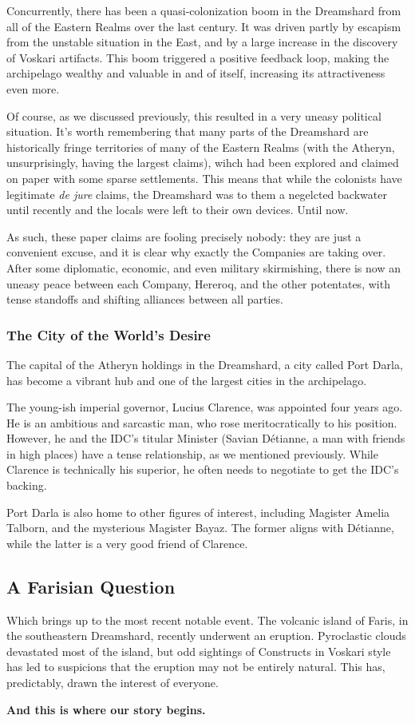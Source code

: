 Concurrently, there has been a quasi-colonization boom in the Dreamshard from all of the Eastern Realms over the last century. It was driven partly by escapism from the unstable situation in the East, and by a large increase in the discovery of Voskari artifacts. This boom triggered a positive feedback loop, making the archipelago wealthy and valuable in and of itself, increasing its attractiveness even more.

Of course, as we discussed previously, this resulted in a very uneasy political situation. It's worth remembering that many parts of the Dreamshard are historically fringe territories of many of the Eastern Realms (with the Atheryn, unsurprisingly, having the largest claims), wihch had been explored and claimed on paper with some sparse settlements. This means that while the colonists have legitimate \textit{de jure} claims, the Dreamshard was to them a negelcted backwater until recently and the locals were left to their own devices. Until now.

As such, these paper claims are fooling precisely nobody: they are just a convenient excuse, and it is clear why exactly the Companies are taking over. After some diplomatic, economic, and even military skirmishing, there is now an uneasy peace between each Company, Hereroq, and the other potentates, with tense standoffs and shifting alliances between all parties.


\subsubsection{The City of the World's Desire}

The capital of the Atheryn holdings in the Dreamshard, a city called Port Darla, has become a vibrant hub and one of the largest cities in the archipelago.

The young-ish imperial governor, Lucius Clarence, was appointed four years ago. He is an ambitious and sarcastic man, who rose meritocratically to his position. However, he and the IDC's titular Minister (Savian Détianne, a man with friends in high places) have a tense relationship, as we mentioned previously. While Clarence is technically his superior, he often needs to negotiate to get the IDC's backing.

Port Darla is also home to other figures of interest, including Magister Amelia Talborn, and the mysterious Magister Bayaz. The former aligns with Détianne, while the latter is a very good friend of Clarence.


\subsection{A Farisian Question}

Which brings up to the most recent notable event. The volcanic island of Faris, in the southeastern Dreamshard, recently underwent an eruption. Pyroclastic clouds devastated most of the island, but odd sightings of Constructs in Voskari style has led to suspicions that the eruption may not be entirely natural. This has, predictably, drawn the interest of everyone.

\vspace{0.5cm}

\textbf{And this is where our story begins.}